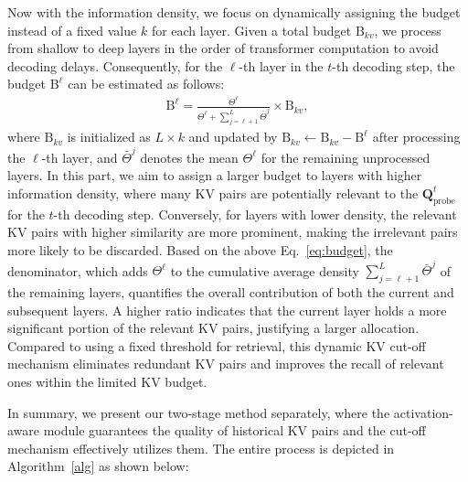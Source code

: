 Now with the information density, we focus on dynamically assigning the budget instead of  a fixed value  $k$  for each layer. Given a total budget $\text{B}_{kv}$, we process from shallow to deep layers in the order of transformer computation to avoid decoding delays. Consequently, for the $\ell$-th layer in the  $t$-th decoding step, the budget $\text{B}^\ell$ can be estimated as follows:
\begin{equation}
\begin{aligned}
\text{B}^\ell = \frac{{\Theta}^\ell}{{{\Theta}^\ell}+{\sum_{j=\ell+1 }^{L}{\bar{\Theta}^j}}}\times \text{B}_{kv},
\label{eq:budget}
\end{aligned}
\end{equation}
where $\text{B}_{kv}$ is initialized as $L \times k$ and updated by $\text{B}_{kv} \leftarrow \text{B}_{kv}- \text{B}^\ell$ after  processing 
 the $\ell$-th layer, and $\bar{\Theta}^j$ denotes the mean $\Theta^\ell$ for the remaining unprocessed layers. In this part, we aim to assign a larger budget to layers with higher information density, where many KV pairs are potentially relevant to the \pq $\mathbf{Q}^{t}_{\text{probe}}$ for the $t$-th decoding step. Conversely, for layers with lower density, the relevant KV pairs with higher similarity are more prominent, making 
 the irrelevant pairs  more likely to be discarded. Based on the above Eq.~\ref{eq:budget}, the denominator, which adds  $\Theta^\ell$  to the cumulative average density  $\sum_{j=\ell+1}^{L} \bar{\Theta}^j$  of the remaining layers, quantifies the overall contribution of both the current and subsequent layers. A higher ratio indicates that the current layer holds a more significant portion of the relevant KV pairs, justifying a larger allocation. Compared to using a fixed threshold for retrieval, this dynamic KV cut-off mechanism eliminates redundant KV pairs and improves the recall of relevant ones within the limited KV budget.
 

In summary, we present our two-stage method separately, where the activation-aware \pq module guarantees the quality of historical KV pairs and the cut-off mechanism effectively utilizes them. The entire process is depicted in Algorithm~\ref{alg} as shown below:

